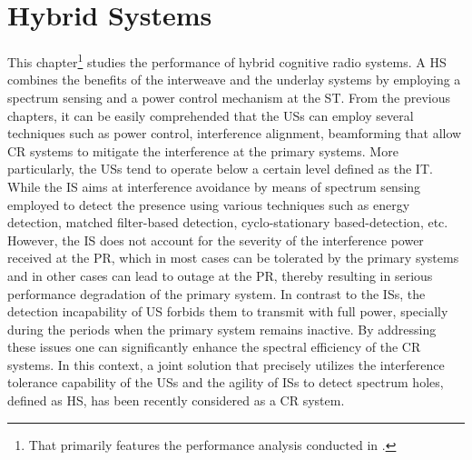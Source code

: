 \chapter{Hybrid Systems} \label{chap:HS}
This chapter\footnote{That primarily features the performance analysis conducted in .} studies the performance of hybrid cognitive radio systems. A HS combines the benefits of the interweave and the underlay systems by employing a spectrum sensing and a power control mechanism at the ST. 
From the previous chapters, it can be easily comprehended that the USs can employ several techniques such as power control, interference alignment, beamforming that allow CR systems to mitigate the interference at the primary systems. More particularly, the USs tend to operate below a certain level defined as the IT. 
While the IS aims at interference avoidance by means of spectrum sensing employed to detect the presence using various techniques such as energy detection, matched filter-based detection, cyclo-stationary based-detection, etc. %
However, the IS does not account for the severity of the interference power received at the PR, which in most cases can be tolerated by the primary systems and in other cases can lead to outage at the PR, thereby resulting in serious performance degradation of the primary system. In contrast to the ISs, the detection incapability of US forbids them to transmit with full power, specially during the periods when the primary system remains inactive. By addressing these issues one can significantly enhance the spectral efficiency of the CR systems. In this context, a joint solution that precisely utilizes the interference tolerance capability of the USs and the agility of ISs to detect spectrum holes, defined as HS, has been recently considered as a CR system. 


